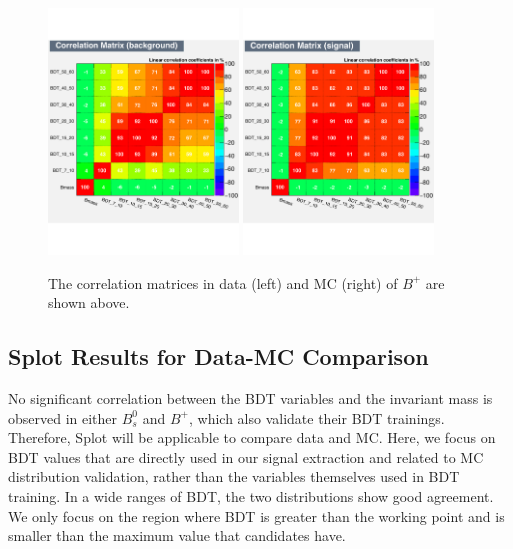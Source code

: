 \begin{figure}[h]
\begin{center}
\includegraphics[width=0.45\textwidth]{Figures/Chapter5/BPBDTCorrB.pdf}
\includegraphics[width=0.45\textwidth]{Figures/Chapter5/BPBDTCorrS.pdf}
\caption{The correlation matrices in data (left) and MC (right) of $B^+$ are shown above.}
\label{BPBDTCorr}
\end{center}
\end{figure}

\subsection{\textbf{Splot} Results for Data-MC Comparison}



No significant correlation between the BDT variables and the invariant mass is observed in either $B^0_s$ and $B^+$, which also validate their BDT trainings. Therefore, Splot will be applicable to compare data and MC. Here, we focus on BDT values that are directly used in our signal extraction and related to MC distribution validation, rather than the variables themselves used in BDT training. In a wide ranges of BDT, the two distributions show good agreement. We only focus on the region where BDT is greater than the working point and is smaller than the maximum value that candidates have.

